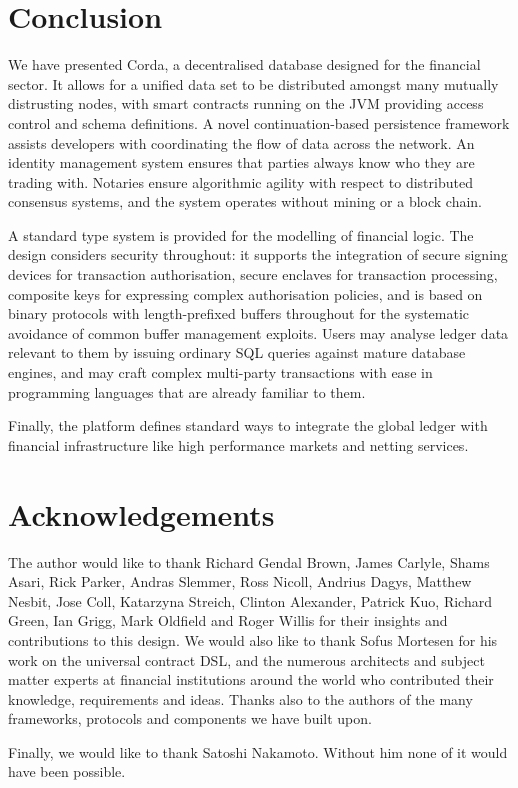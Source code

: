 \documentclass{article}
\begin{document}
\section{Conclusion}\label{sec:conclusion}

We have presented Corda, a decentralised database designed for the financial sector. It allows for a unified data
set to be distributed amongst many mutually distrusting nodes, with smart contracts running on the JVM providing
access control and schema definitions. A novel continuation-based persistence framework assists developers with
coordinating the flow of data across the network. An identity management system ensures that parties always know
who they are trading with. Notaries ensure algorithmic agility with respect to distributed consensus systems, and
the system operates without mining or a block chain.

A standard type system is provided for the modelling of financial logic. The design considers security throughout:
it supports the integration of secure signing devices for transaction authorisation, secure enclaves for
transaction processing, composite keys for expressing complex authorisation policies, and is based on binary
protocols with length-prefixed buffers throughout for the systematic avoidance of common buffer management
exploits. Users may analyse ledger data relevant to them by issuing ordinary SQL queries against mature database
engines, and may craft complex multi-party transactions with ease in programming languages that are already
familiar to them.

Finally, the platform defines standard ways to integrate the global ledger with financial infrastructure like high
performance markets and netting services.

\section{Acknowledgements}

The author would like to thank Richard Gendal Brown, James Carlyle, Shams Asari, Rick Parker, Andras Slemmer, Ross
Nicoll, Andrius Dagys, Matthew Nesbit, Jose Coll, Katarzyna Streich, Clinton Alexander, Patrick Kuo, Richard Green,
Ian Grigg, Mark Oldfield and Roger Willis for their insights and contributions to this design. We would also like
to thank Sofus Mortesen for his work on the universal contract DSL, and the numerous architects and subject matter
experts at financial institutions around the world who contributed their knowledge, requirements and ideas. Thanks
also to the authors of the many frameworks, protocols and components we have built upon.

Finally, we would like to thank Satoshi Nakamoto. Without him none of it would have been possible.



\end{document}
